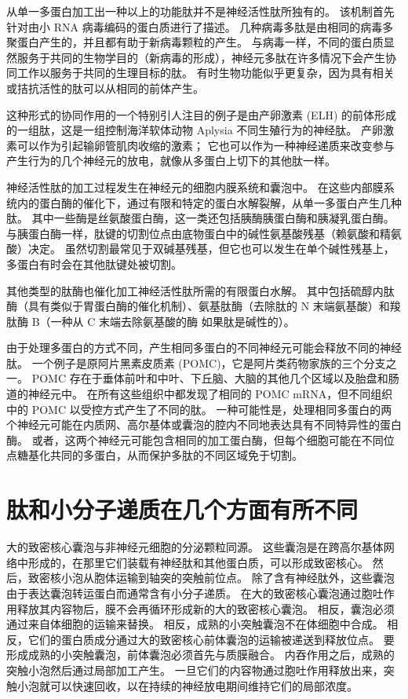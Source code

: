 从单一多蛋白加工出一种以上的功能肽并不是神经活性肽所独有的。
该机制首先针对由小 RNA 病毒编码的蛋白质进行了描述。
几种病毒多肽是由相同的病毒多聚蛋白产生的，并且都有助于新病毒颗粒的产生。
与病毒一样，不同的蛋白质显然服务于共同的生物学目的（新病毒的形成），神经元多肽在许多情况下会产生协同工作以服务于共同的生理目标的肽。
有时生物功能似乎更复杂，因为具有相关或拮抗活性的肽可以从相同的前体产生。


这种形式的协同作用的一个特别引人注目的例子是由产卵激素 (ELH) 的前体形成的一组肽，这是一组控制海洋软体动物 Aplysia 不同生殖行为的神经肽。
产卵激素可以作为引起输卵管肌肉收缩的激素；
它也可以作为一种神经递质来改变参与产生行为的几个神经元的放电，就像从多蛋白上切下的其他肽一样。


神经活性肽的加工过程发生在神经元的细胞内膜系统和囊泡中。
在这些内部膜系统内的蛋白酶的催化下，通过有限和特定的蛋白水解裂解，从单一多蛋白产生几种肽。
其中一些酶是丝氨酸蛋白酶，这一类还包括胰酶胰蛋白酶和胰凝乳蛋白酶。
与胰蛋白酶一样，肽键的切割位点由底物蛋白中的碱性氨基酸残基（赖氨酸和精氨酸）决定。
虽然切割最常见于双碱基残基，但它也可以发生在单个碱性残基上，多蛋白有时会在其他肽键处被切割。


其他类型的肽酶也催化加工神经活性肽所需的有限蛋白水解。
其中包括硫醇内肽酶（具有类似于胃蛋白酶的催化机制）、氨基肽酶（去除肽的 N 末端氨基酸）和羧肽酶 B（一种从 C 末端去除氨基酸的酶 如果肽是碱性的）。


由于处理多蛋白的方式不同，产生相同多蛋白的不同神经元可能会释放不同的神经肽。
一个例子是原阿片黑素皮质素 (POMC)，它是阿片类药物家族的三个分支之一。
POMC 存在于垂体前叶和中叶、下丘脑、大脑的其他几个区域以及胎盘和肠道的神经元中。
在所有这些组织中都发现了相同的 POMC mRNA，但不同组织中的 POMC 以受控方式产生了不同的肽。
一种可能性是，处理相同多蛋白的两个神经元可能在内质网、高尔基体或囊泡的腔内不同地表达具有不同特异性的蛋白酶。
或者，这两个神经元可能包含相同的加工蛋白酶，但每个细胞可能在不同位点糖基化共同的多蛋白，从而保护多肽的不同区域免于切割。



\section{肽和小分子递质在几个方面有所不同}

大的致密核心囊泡与非神经元细胞的分泌颗粒同源。
这些囊泡是在跨高尔基体网络中形成的，在那里它们装载有神经肽和其他蛋白质，可以形成致密核心。
然后，致密核小泡从胞体运输到轴突的突触前位点。
除了含有神经肽外，这些囊泡由于表达囊泡转运蛋白而通常含有小分子递质。
在大的致密核心囊泡通过胞吐作用释放其内容物后，膜不会再循环形成新的大的致密核心囊泡。
相反，囊泡必须通过来自体细胞的运输来替换。
相反，成熟的小突触囊泡不在体细胞中合成。
相反，它们的蛋白质成分通过大的致密核心前体囊泡的运输被递送到释放位点。
要形成成熟的小突触囊泡，前体囊泡必须首先与质膜融合。
内吞作用之后，成熟的突触小泡然后通过局部加工产生。 
一旦它们的内容物通过胞吐作用释放出来，突触小泡就可以快速回收，以在持续的神经放电期间维持它们的局部浓度。


